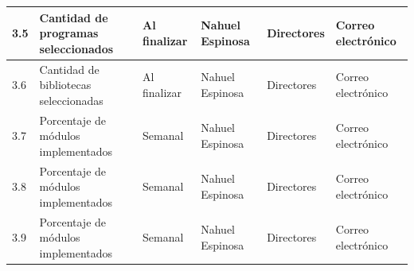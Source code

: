 \documentclass[11pt]{charter}
\begin{document}
\begin{table}[!htpb]
\begin{tabularx}{\linewidth}{@{}|m{1.5cm}|m{3cm}|X|X|X|X|@{}}
 3.5  & Cantidad de programas seleccionados                & Al finalizar & Nahuel Espinosa & Directores & Correo electrónico \\ \hline
 3.6  & Cantidad de bibliotecas seleccionadas              & Al finalizar & Nahuel Espinosa & Directores & Correo electrónico \\ \hline
 3.7  & Porcentaje de módulos implementados                & Semanal      & Nahuel Espinosa & Directores & Correo electrónico \\ \hline
 3.8  & Porcentaje de módulos implementados                & Semanal      & Nahuel Espinosa & Directores & Correo electrónico \\ \hline
 3.9  & Porcentaje de módulos implementados                & Semanal      & Nahuel Espinosa & Directores & Correo electrónico \\ \hline
\end{tabularx}%
\end{table}
\end{document}
